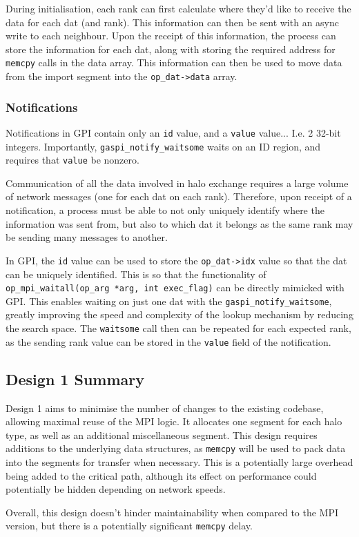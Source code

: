 During initialisation, each rank can first calculate where they'd like to receive the data for each dat (and rank). This information can then be sent with an async write to each neighbour. Upon the receipt of this information, the process can store the information for each dat, along with storing the required address for \texttt{memcpy} calls in the data array. This information can then be used to move data from the import segment into the \texttt{op\_dat->data} array. 

\subsubsection{Notifications}
Notifications in GPI contain only an \texttt{id} value, and a \texttt{value} value... I.e. 2 32-bit integers. Importantly, \texttt{gaspi\_notify\_waitsome} waits on an ID region, and requires that \texttt{value} be nonzero.

Communication of all the data involved in halo exchange requires a large volume of network messages (one for each dat on each rank). Therefore, upon receipt of a notification, a process must be able to not only uniquely identify where the information was sent from, but also to which dat it belongs as the same rank may be sending many messages to another. 

In GPI, the \texttt{id} value can be used to store the \texttt{op\_dat->idx} value so that the dat can be uniquely identified. This is so that the functionality of \texttt{op\_mpi\_waitall(op\_arg *arg, int exec\_flag)} can be directly mimicked with GPI. This enables waiting on just one dat with the \texttt{gaspi\_notify\_waitsome}, greatly improving the speed and complexity of the lookup mechanism by reducing the search space. The \texttt{waitsome} call then can be repeated for each expected rank, as the sending rank value can be stored in the \texttt{value} field of the notification.

\subsection{Design 1 Summary}
Design 1 aims to minimise the number of changes to the existing codebase, allowing maximal reuse of the MPI logic. It allocates one segment for each halo type, as well as an additional miscellaneous segment. This design requires additions to the underlying data structures, as \texttt{memcpy} will be used to pack data into the segments for transfer when necessary. This is a potentially large overhead being added to the critical path, although its effect on performance could potentially be hidden depending on network speeds.

Overall, this design doesn't hinder maintainability when compared to the MPI version, but there is a potentially significant \texttt{memcpy} delay.